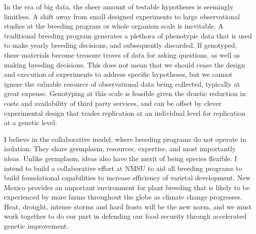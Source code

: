 \documentclass[11pt]{article}
\begin{document}
In the era of big data, the sheer amount of testable hypotheses is seemingly limitless. A shift away from small designed experiments to large observational studies at the breeding program or whole organism scale is inevitable. A traditional breeding program generates a plethora of phenotypic data that is used to make yearly breeding decisions, and subsequently discarded. If genotyped, these materials become treasure troves of data for asking questions, as well as making breeding decisions. This does not mean that we should cease the design and execution of experiments to address specific hypotheses, but we cannot ignore the valuable resource of observational data being collected, typically at great expense. Genotyping at this scale is feasible given the drastic reduction in costs and availability of third party services, and can be offset by clever experimental design that trades replication at an individual level for replication at a genetic level.


I believe in the collaborative model, where breeding programs do not operate in isolation. They share germplasm, resources, expertise, and most importantly ideas. Unlike germplasm, ideas also have the merit of being species flexible. I intend to build a collaborative effort at NMSU to aid all breeding programs to build foundational capabilities to increase efficiency of varietal development. New Mexico provides an important environment for plant breeding that is likely to be experienced by more farms throughout the globe as climate change progresses. Heat, drought, intense storms and hard frosts will be the new norm, and we must work together to do our part in defending our food security through accelerated genetic improvement. 
\end{document}

